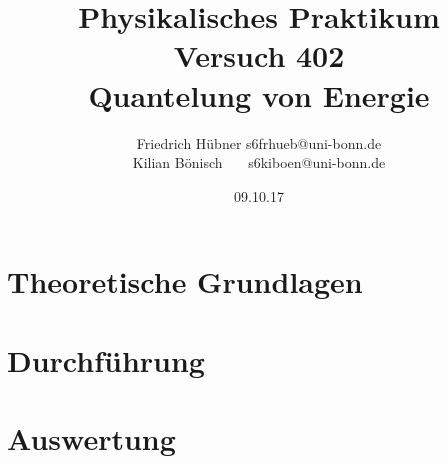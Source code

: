 \documentclass{article}
\newcommand{\RM}[1]{\MakeUppercase{\romannumeral #1}}
\begin{document}
\setlength{\parindent}{0em}   %
\title{Physikalisches Praktikum \RM{4}\\Versuch 402\\Quantelung von Energie}
\author{Friedrich Hübner \qquad s6frhueb@uni-bonn.de \\
  Kilian Bönisch \ \ \ \qquad s6kiboen@uni-bonn.de }
\date{09.10.17}

\maketitle

\thispagestyle{empty}

\newpage



\section{Theoretische Grundlagen}



\section{Durchführung}



\section{Auswertung}



\printbibliography
\end{document}
